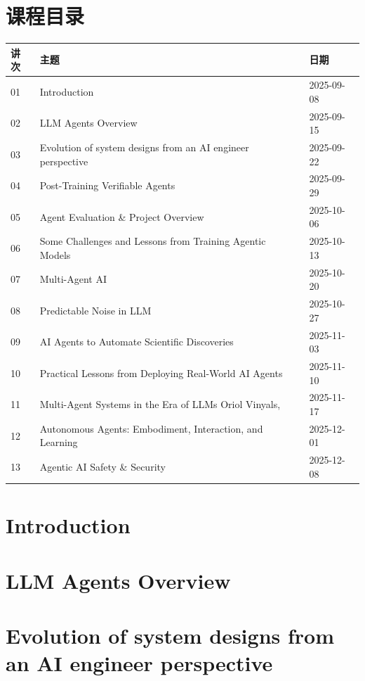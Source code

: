 \documentclass[a4paper]{article}
\begin{document}
\section*{课程目录}
\begin{longtable}{p{}p{}p{}}
\textbf{讲次} & \textbf{主题} & \textbf{日期}\\
\hline
01 & Introduction & 2025-09-08\\
02 & LLM Agents Overview & 2025-09-15\\
03 & Evolution of system designs from an AI engineer perspective & 2025-09-22\\
04 & Post-Training Verifiable Agents & 2025-09-29\\
05 & Agent Evaluation \& Project Overview & 2025-10-06\\
06 & Some Challenges and Lessons from Training Agentic Models & 2025-10-13\\
07 & Multi-Agent AI & 2025-10-20\\
08 & Predictable Noise in LLM & 2025-10-27\\
09 & AI Agents to Automate Scientific Discoveries & 2025-11-03\\
10 & Practical Lessons from Deploying Real-World AI Agents & 2025-11-10\\
11 & Multi-Agent Systems in the Era of LLMs Oriol Vinyals, & 2025-11-17\\
12 & Autonomous Agents: Embodiment, Interaction, and Learning & 2025-12-01\\
13 & Agentic AI Safety \& Security & 2025-12-08\\
\end{longtable}

\section{Introduction}


\section{LLM Agents Overview}


\section{Evolution of system designs from an AI engineer perspective}

\end{document}
